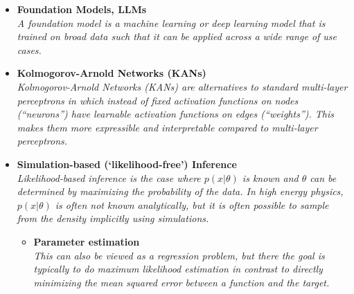 \documentclass[12pt,letterpaper]{article}
\begin{document}
\begin{itemize}
\item \textbf{Foundation Models, LLMs}~\cite{Tani:2025osu,Mikuni:2025tar,Amram:2024fjg,Ho:2024qyf,OmanaKuttan:2024mwr,Wildridge:2024yeg,Leigh:2024ked,Mikuni:2024qsr,Zhang:2024kws,Fanelli:2024ktq,Harris:2024sra,Birk:2024knn,Vigl:2024lat}
  \\\textit{A foundation model is a machine learning or deep learning model that is trained on broad data such that it can be applied across a wide range of use cases.}
\item \textbf{Kolmogorov-Arnold Networks (KANs)}~\cite{Dai:2025dir,Kou:2024hzd,Abasov:2024hyq,Erdmann:2024unt}
  \\\textit{Kolmogorov-Arnold Networks (KANs) are alternatives to standard multi-layer perceptrons in which instead of fixed activation functions on nodes (``neurons'') have learnable activation functions on edges (``weights''). This makes them more expressible and interpretable compared to multi-layer perceptrons.}
\item \textbf{Simulation-based (`likelihood-free') Inference}
\\\textit{Likelihood-based inference is the case where $p(x|\theta)$ is known and $\theta$ can be determined by maximizing the probability of the data.  In high energy physics, $p(x|\theta)$ is often not known analytically, but it is often possible to sample from the density implicitly using simulations.}
	\begin{itemize}
		\item \textbf{Parameter estimation}~\cite{Zhang:2025mmm,Nishimura:2025knz,Acosta:2025lsu,Sluijter:2025isc,Araz:2025ezp,DeLuca:2025ruv,Villarreal:2025mhv,Aarts:2025gyp,Alda:2024sup,ATLAS:2024ynn,Heimel:2024drk,Maitre:2024hzp,Bahl:2024meb,JETSCAPE:2024cqe,Mastandrea:2024irf,Diaz:2024yfu,Alvarez:2024owq,Chatterjee:2024pbp,Chai:2024zyl,Heimel:2023mvw,Espejo:2023wzf,Barrue:2023ysk,Morandini:2023pwj,Erdogan:2023uws,Breitenmoser:2023tmi,Heinrich:2023bmt,Rizvi:2023mws,Neubauer:2022gbu,Butter:2022vkj,Arganda:2022zbs,Kong:2022rnd,Arganda:2022qzy,Bahl:2021dnc,Barman:2021yfh,Mishra-Sharma:2021oxe,NEURIPS2020_a878dbeb,Chatterjee:2021nms,Nachman:2021yvi,Bieringer:2020tnw,Flesher:2020kuy,Coogan:2020yux,Andreassen:2020gtw,Cranmer:2015bka,Brehmer:2018hga,Brehmer:2019xox,Brehmer:2018eca,Brehmer:2018kdj,Hollingsworth:2020kjg,Stoye:2018ovl,Andreassen:2019nnm}
		\\\textit{This can also be viewed as a regression problem, but there the goal is typically to do maximum likelihood estimation in contrast to directly minimizing the mean squared error between a function and the target.}

\end{itemize}
\end{itemize}
\end{document}
